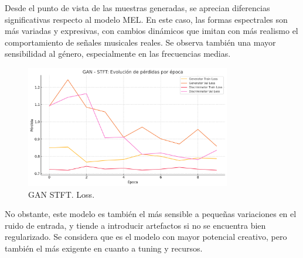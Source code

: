 Desde el punto de vista de las muestras generadas, se aprecian diferencias significativas respecto al modelo MEL. En este caso, las formas espectrales son más variadas y expresivas, con cambios dinámicos que imitan con más realismo el comportamiento de señales musicales reales. Se observa también una mayor sensibilidad al género, especialmente en las frecuencias medias.

\begin{figure}[H]
    \centering
    \includegraphics[width=0.8\textwidth]{images/gan_stft_loss_plot.png}
    \caption{GAN STFT. Loss.}
\end{figure}

No obstante, este modelo es también el más sensible a pequeñas variaciones en el ruido de entrada, y tiende a introducir artefactos si no se encuentra bien regularizado. Se considera que es el modelo con mayor potencial creativo, pero también el más exigente en cuanto a tuning y recursos.

